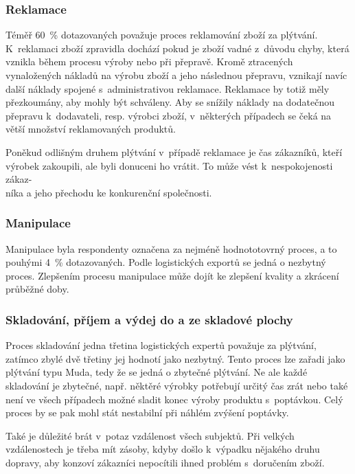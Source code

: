 \subsubsection*{Reklamace}

Téměř 60~\% dotazovaných považuje proces reklamování zboží za plýtvání. K~reklamaci zboží zpravidla dochází pokud je zboží vadné z~důvodu chyby, která vznikla během procesu výroby nebo při přepravě. Kromě ztracených vynaložených nákladů na výrobu zboží a jeho následnou přepravu, vznikají navíc další náklady spojené s~administrativou reklamace. Reklamace by totiž měly přezkoumány, aby mohly být schváleny. Aby se snížily náklady na dodatečnou přepravu k~dodavateli, resp. výrobci zboží, v~některých případech se čeká na větší množství reklamovaných produktů.

Poněkud odlišným druhem plýtvání v~případě reklamace je čas zákazníků, kteří výrobek zakoupili, ale byli donuceni ho vrátit. To může vést k~nespokojenosti zákaz-\\níka a jeho přechodu ke konkurenční společnosti.

\subsubsection*{Manipulace}

Manipulace byla respondenty označena za nejméně hodnototovrný proces, a to pouhými 4~\% dotazovaných. Podle logistických exportů se jedná o nezbytný proces. Zlepšením procesu manipulace může dojít ke zlepšení kvality a zkrácení průběžné doby.

\subsubsection*{Skladování, příjem a výdej do a ze skladové plochy}

Proces skladování jedna třetina logistických expertů považuje za plýtvání, zatímco zbylé dvě třetiny jej hodnotí jako nezbytný. Tento proces lze zařadi jako plýtvání typu Muda, tedy že se jedná o zbytečné plýtvání. Ne ale každé skladování je zbytečné, např. něktěré výrobky potřebují určitý čas zrát nebo také není ve všech případech možné sladit konec výroby produktu s~poptávkou. Celý proces by se pak mohl stát nestabilní při náhlém zvýšení poptávky.        

Také je důležité brát v~potaz vzdálenost všech subjektů. Při velkých vzdálenostech je třeba mít zásoby, kdyby došlo k~výpadku nějakého druhu dopravy, aby konzoví zákazníci nepocítili ihned problém s~doručením zboží.

